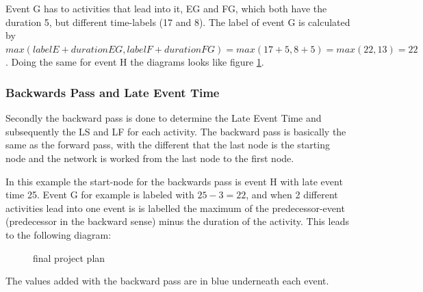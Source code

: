 Event G has to activities that lead into it, EG and FG, which both have the duration 5, but different time-labels (17 and 8). The label of event G is calculated by $ max(label E + duration EG, label F + duration FG) = max(17+5, 8+5) = max(22,13) = 22 $. Doing the same for event H the diagrams looks like figure \ref{pic:plan5}.
\begin{figure}[h] 
\centerline{}
\label{pic:plan5}
\caption{}
\end{figure}
\subsubsection{Backwards Pass and Late Event Time}
 Secondly the backward pass is done to determine the Late Event Time and subsequently the LS and LF for each activity.
 The backward pass is basically the same as the forward pass, with the different that the last node is the starting node and the network is worked from the last node to the first node.

In this example the start-node for the backwards pass is event H with late event time 25. Event G for example is labeled with $ 25-3 = 22 $, and when 2 different activities lead into one event is is labelled the maximum of the predecessor-event (predecessor in the backward sense) minus the duration of the activity. This leads to the following diagram:
\begin{figure}[h] 
\centerline{}
\label{pic:plan6}
\caption{final project plan}
\end{figure}
The values added with the backward pass are in blue underneath each event.

